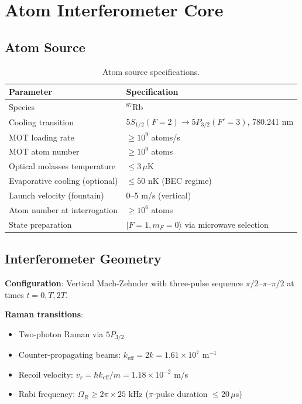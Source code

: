 \documentclass[12pt,a4paper]{article}
\begin{document}
\section{Atom Interferometer Core}\label{sec:aic}

\subsection{Atom Source}

\begin{table}[H]
\centering
\begin{tabular}{ll}
\toprule
\textbf{Parameter} & \textbf{Specification} \\
\midrule
Species & $^{87}$Rb \\
Cooling transition & $5S_{1/2}(F=2) \to 5P_{3/2}(F'=3)$, 780.241 nm \\
MOT loading rate & $\geq 10^9$ atoms/s \\
MOT atom number & $\geq 10^9$ atoms \\
Optical molasses temperature & $\leq 3\,\mu$K \\
Evaporative cooling (optional) & $\leq 50$ nK (BEC regime) \\
Launch velocity (fountain) & 0--5 m/s (vertical) \\
Atom number at interrogation & $\geq 10^6$ atoms \\
State preparation & $|F=1, m_F=0\rangle$ via microwave selection \\
\bottomrule
\end{tabular}
\caption{Atom source specifications.}
\end{table}

\subsection{Interferometer Geometry}

\textbf{Configuration}: Vertical Mach-Zehnder with three-pulse sequence
$\pi/2$--$\pi$--$\pi/2$ at times $t = 0, T, 2T$.

\textbf{Raman transitions}:
\begin{itemize}
\item Two-photon Raman via $5P_{3/2}$
\item Counter-propagating beams: $k_{\text{eff}} = 2k = 1.61 \times 10^7$ m$^{-1}$
\item Recoil velocity: $v_r = \hbar k_{\text{eff}}/m = 1.18 \times 10^{-2}$ m/s
\item Rabi frequency: $\Omega_R \geq 2\pi \times 25$ kHz ($\pi$-pulse
duration $\leq 20\,\mu$s)
\end{itemize}
\end{document}
